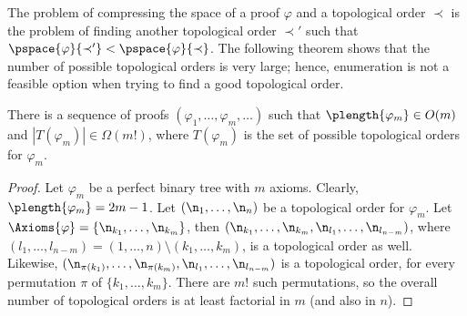 The problem of compressing the space of a proof $\varphi$ and a topological order $\prec$ is the problem of finding another topological order $\prec'$ such that $\pspace{\varphi}{\prec'} < \pspace{\varphi}{\prec}$. The following theorem shows that the number of possible topological orders is very large; hence, enumeration is not a feasible option when trying to find a good topological order.

\begin{theorem}
\label{theorem:enumeration}
There is a sequence of proofs $(\varphi_1,\ldots,\varphi_m,\ldots)$ such that $\plength{\varphi_m} \in O(m)$ and $|T(\varphi_m)| \in \Omega(m!)$, where $T(\varphi_m)$ is the set of possible topological orders for $\varphi_m$.
\end{theorem}
\begin{proof}
Let $\varphi_m$ be a perfect binary tree with $m$ axioms. Clearly, $\plength{\varphi_m} = 2m-1$.
Let $(\n_1,\ldots,\n_n)$ be a topological order for $\varphi_m$. 
Let $\Axioms{\varphi} = \{\n_{k_1},\ldots,\n_{k_m}\}$, then $(\n_{k_1},\ldots,\n_{k_m},\n_{l_1},\ldots,\n_{l_{n-m}})$, where $(l_1,\ldots,l_{n-m}) = (1,\ldots,n) \setminus (k_1,\ldots,k_m)$, is a topological order as well. 
Likewise, $(\n_{\pi({k_1})},\ldots,\n_{\pi({k_m})},\n_{l_1},\ldots,\n_{l_{n-m}})$ is a topological order, for every permutation $\pi$ of $\{k_1,\ldots,k_m\}$. There are $m!$ such permutations, so the overall number of topological orders is at least factorial in $m$ (and also in $n$).
\end{proof}

